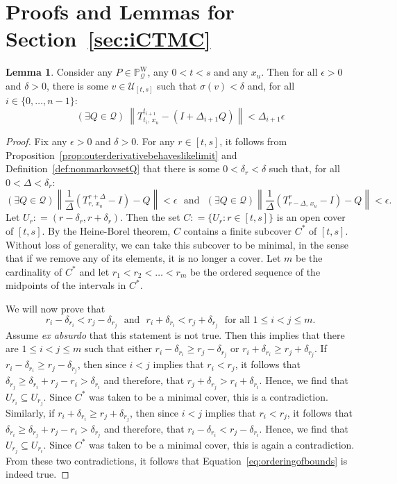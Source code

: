 \documentclass[10pt]{paper}
\theoremstyle{definition}
\newtheorem{lemma}[theorem]{Lemma}
\newcommand{\processes}{\mathbb{P}}
\newcommand{\wprocesses}{\processes^{\mathrm{W}}}
\newcommand{\rateset}{\mathcal{Q}}
\newcommand{\norm}[1]{\left\lVert #1 \right\rVert}
\newcommand{\coloneqq}{:\!=}
\begin{document}
\section{Proofs and Lemmas for Section~\ref{sec:iCTMC}}

\begin{lemma}\label{lemma:bound_on_linear_approx_partition}
Consider any $P\in\wprocesses_\rateset$, any $0<t<s$ and any $x_u$. Then for all $\epsilon>0$ and $\delta>0$, there is some $v\in\mathcal{U}_{[t,s]}$ such that $\sigma(v)<\delta$ and, for all $i\in\{0,\dots,n-1\}$:
\begin{equation*}
(\exists Q\in\rateset)
~
\norm{
T^{t_{i+1}}_{t_i,\,x_u}-(I+\Delta_{i+1}Q)
}<\Delta_{i+1}\epsilon
\end{equation*}
\end{lemma}
\begin{proof}
Fix any $\epsilon>0$ and $\delta>0$.
For any $r\in[t,s]$, it follows from Proposition~\ref{prop:outerderivativebehaveslikelimit} and Definition~\eqref{def:nonmarkovsetQ} that there is some $0<\delta_r<\delta$ such that, for all $0<\Delta<\delta_r$:
\begin{equation}\label{eq:epsilonboundsforlemma}
(\exists Q\in\rateset)
\norm{\frac{1}{\Delta}
(T^{r+\Delta}_{r,\,x_u}-I)-Q}<\epsilon
\text{~~and~~}
(\exists Q\in\rateset)
\norm{\frac{1}{\Delta}
(T^{r}_{r-\Delta,\,x_u}-I)-Q}<\epsilon.
\end{equation}
Let $U_r\coloneqq(r-\delta_r,r+\delta_r)$. Then the set $C\coloneqq\{U_r\colon r\in[t,s]\}$ is an open cover of $[t,s]$. By the Heine-Borel theorem, $C$ contains a finite subcover $C^*$ of $[t,s]$. Without loss of generality, we can take this subcover to be minimal, in the sense that if we remove any of its elements, it is no longer a cover. Let $m$ be the cardinality of $C^*$ and let $r_1<r_2<\dots<r_m$ be the ordered sequence of the midpoints of the intervals in $C^*$.

We will now prove that
\begin{equation}\label{eq:orderingofbounds}
r_i-\delta_{r_i}<r_j-\delta_{r_j}
\text{~~and~~}
r_i+\delta_{r_i}<r_j+\delta_{r_j}
\text{~~for all $1\leq i<j\leq m$.}
\end{equation}
Assume \emph{ex absurdo} that this statement is not true. Then this implies that there are $1\leq i<j\leq m$ such that either $r_i-\delta_{r_i}\geq r_j-\delta_{r_j}$ or $r_i+\delta_{r_i}\geq r_j+\delta_{r_j}$. If $r_i-\delta_{r_i}\geq r_j-\delta_{r_j}$, then since $i<j$ implies that $r_i<r_j$, it follows that $\delta_{r_j}\geq\delta_{r_i}+r_j-r_i>\delta_{r_i}$ and therefore, that $r_j+\delta_{r_j}>r_i+\delta_{r_i}$. 
Hence, we find that $U_{r_i}\subseteq U_{r_j}$. Since $C^*$ was taken to be a minimal cover, this is a contradiction.
Similarly, if $r_i+\delta_{r_i}\geq r_j+\delta_{r_j}$, then since $i<j$ implies that $r_i<r_j$, it follows that $\delta_{r_i}\geq\delta_{r_j}+r_j-r_i>\delta_{r_j}$ and therefore, that $r_i-\delta_{r_i}<r_j-\delta_{r_i}$. Hence, we find that $U_{r_j}\subseteq U_{r_i}$. Since $C^*$ was taken to be a minimal cover, this is again a contradiction. From these two contradictions, it follows that Equation~\eqref{eq:orderingofbounds} is indeed true.


\end{proof}
\end{document}
